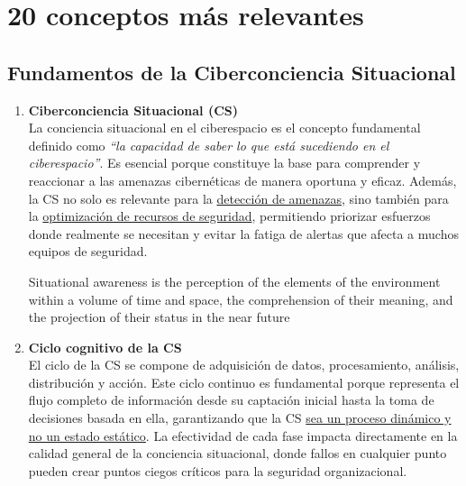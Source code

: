 \chapter{20 conceptos más relevantes}

\section{Fundamentos de la Ciberconciencia Situacional}
\begin{enumerate}
\item \textbf{Ciberconciencia Situacional (CS)} \\
La conciencia situacional en el ciberespacio es el concepto fundamental definido como \textit{``la capacidad de saber lo que está sucediendo en el ciberespacio''}. Es esencial porque constituye la base para comprender y reaccionar a las amenazas cibernéticas de manera oportuna y eficaz.
Además, la CS no solo es relevante para la \ul{detección de amenazas}, sino también para la \ul{optimización de recursos de seguridad}, permitiendo priorizar esfuerzos donde realmente se necesitan y evitar la fatiga de alertas que afecta a muchos equipos de seguridad.

\begin{definition}
   Situational awareness is the perception of the elements of the environment within
   a volume of time and space, the comprehension of their meaning, and the
   projection of their status in the near future
\end{definition}

\item \textbf{Ciclo cognitivo de la CS} \\
El ciclo de la CS se compone de adquisición de datos, procesamiento, análisis, distribución y acción. Este ciclo continuo es fundamental porque representa el flujo completo de información desde su captación inicial hasta la toma de decisiones basada en ella, garantizando que la CS \ul{sea un proceso dinámico y no un estado estático}. La efectividad de cada fase impacta directamente en la calidad general de la conciencia situacional, donde fallos en cualquier punto pueden crear puntos ciegos críticos para la seguridad organizacional.


\end{enumerate}
